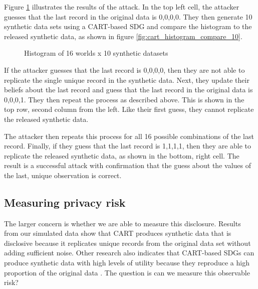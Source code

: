 \documentclass[a4paper,11pt]{style/uneceart}
\begin{document}
Figure \ref{fig:attacker_default} illustrates the results of the attack.  In the top left cell, the attacker guesses that the last record in the original data is 0,0,0,0.  They then generate 10 synthetic data sets using a CART-based SDG and compare the histogram to the released synthetic data, as shown in figure \ref{fig:cart_histogram_compare_10}.  

\begin{figure}[!h]
    \centering
    \caption{Histogram of 16 worlds x 10 synthetic datasets}
    \label{fig:attacker_default}
\end{figure}

If the attacker guesses that the last record is 0,0,0,0, then they are not able to replicate the single unique record in the synthetic data.  Next, they update their beliefs about the last record and guess that the last record in the original data is 0,0,0,1.  They then repeat the process as described above.  This is shown in the top row, second column from the left.  Like their first guess, they cannot replicate the released synthetic data.  

The attacker then repeats this process for all 16 possible combinations of the last record.  Finally, if they guess that the last record is 1,1,1,1, then they are able to replicate the released synthetic data, as shown in the bottom, right cell.  The result is a successful attack with confirmation that the guess about the values of the last, unique observation is correct.

\subsection{Measuring privacy risk}

The larger concern is whether we are able to measure this disclosure.  Results from our simulated data show that CART produces synthetic data that is disclosive because it replicates unique records from the original data set without adding sufficient noise.  Other research also indicates that CART-based SDGs can produce synthetic data with high levels of utility because they reproduce a high proportion of the original data \cite{manrique2018bayesian}.  The question is can we measure this observable risk?
\end{document}
